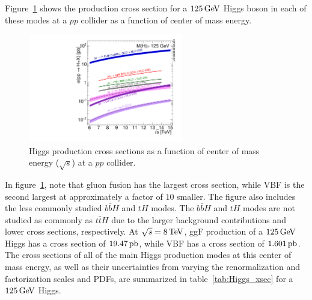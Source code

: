 Figure~\ref{fig:Higgs_xsec} shows the production cross section for a $125 \GeV$ Higgs boson in each of these modes at a $pp$ collider as a function of center of mass energy. 

\begin{figure}[h!]
  \centering
  \captionsetup{justification=centering}

  \includegraphics[width=0.6\textwidth,angle=270]{figures/h125_xsec}
  \caption{Higgs production cross sections as a function of center of mass energy ($\sqrt{s}$) at a $pp$ collider\cite{LHCXSWG}.}
  \label{fig:Higgs_xsec}
\end{figure}

In figure~\ref{fig:Higgs_xsec}, note that gluon fusion has the largest cross section, while VBF is the second largest at approximately a factor of $10$ smaller. The figure also includes the less commonly studied $b\bar{b}H$ and $tH$ modes. The $b\bar{b}H$ and $tH$ modes are not studied as commonly as $t\bar{t}H$ due to the larger background contributions and lower cross sections, respectively. At $\sqrt{s} = 8 \TeV$, ggF production of a $125 \GeV$ Higgs has a cross section of $19.47 \mbox{\,pb}$, while VBF has a cross section of $1.601 \mbox{\,pb}$\cite{LHCXSWG}. The cross sections of all of the main Higgs production modes at this center of mass energy, as well as their uncertainties from varying the renormalization and factorization scales and PDFs, are summarized in table~\ref{tab:Higgs_xsec} for a $125 \GeV$ Higgs.

